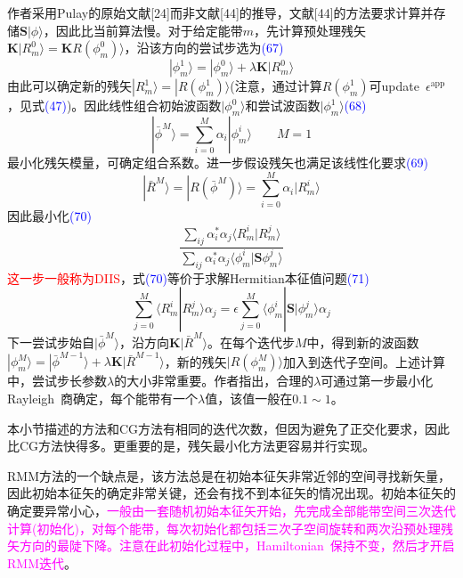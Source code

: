 \documentclass[14pt]{article}      %
\begin{document}
作者采用\textrm{Pulay}的原始文献[24]而非文献[44]的推导，文献[44]的方法要求计算并存储$\mathbf{S}|\phi\rangle$，因此比当前算法慢。对于给定能带$m$，先计算预处理残矢$\mathbf{K}|R_m^0\rangle=\mathbf{K}R(\phi_m^0)\rangle$，沿该方向的尝试步选为\textcolor{blue}{(67)}
\begin{displaymath}
	|\phi_m^1\rangle=|\phi_m^0\rangle+\lambda\mathbf{K}|R_m^0\rangle
\end{displaymath}
由此可以确定新的残矢$|R_m^1\rangle=|R(\phi_m^1)\rangle$(注意，通过计算$R(\phi_m^1)$可\textrm{update}~$\epsilon^{\mathrm{app}}$，见式\textcolor{blue}{(47)})。因此线性组合初始波函数$|\phi_m^0\rangle$和尝试波函数$|\phi_m^1\rangle$\textcolor{blue}{(68)}
\begin{displaymath}
	|\bar{\phi}^M\rangle=\sum_{i=0}^M\alpha_i|\phi_m^i\rangle\qquad M=1
\end{displaymath}
最小化残矢模量，可确定组合系数。进一步假设残矢也满足该线性化要求\textcolor{blue}{(69)}
\begin{displaymath}
	|\bar{R}^M\rangle=|R(\bar{\phi}^M)\rangle=\sum_{i=0}^M\alpha_i|R_m^i\rangle
\end{displaymath}
因此最小化\textcolor{blue}{(70)}
\begin{displaymath}
	\dfrac{\sum_{ij}\alpha_i^{\ast}\alpha_j\langle R_m^i|R_m^j\rangle}{\sum_{ij}\alpha_i^{\ast}\alpha_j\langle\phi_m^i|\mathbf{S}\phi_m^j\rangle}
\end{displaymath}
\textcolor{red}{这一步一般称为\textrm{DIIS}}，式\textcolor{blue}{(70)}等价于求解\textrm{Hermitian}本征值问题\textcolor{blue}{(71)}
\begin{displaymath}
	\sum_{j=0}^M\langle R_m^i|R_m^j\rangle\alpha_j=\epsilon\sum_{j=0}^M\langle\phi_m^i|\mathbf{S}|\phi_m^j\rangle\alpha_j
\end{displaymath}
下一尝试步始自$|\bar{\phi}^M\rangle$，沿方向$\mathbf{K}|\bar{R}^M\rangle$。在每个迭代步$M$中，得到新的波函数$|\phi_m^M\rangle=|\bar{\phi}^{M-1}\rangle+\lambda\mathbf{K}|\bar{R}^{M-1}\rangle$，新的残矢$|R(\phi_m^M)\rangle$加入到迭代子空间。上述计算中，尝试步长参数$\lambda$的大小非常重要。作者指出，合理的$\lambda$可通过第一步最小化\textrm{Rayleigh~}商确定，每个能带有一个$\lambda$值，该值一般在$0.1\sim1$。

本小节描述的方法和\textrm{CG}方法有相同的迭代次数，但因为避免了正交化要求，因此比\textrm{CG}方法快得多。更重要的是，残矢最小化方法更容易并行实现。

\textrm{RMM}方法的一个缺点是，该方法总是在初始本征矢非常近邻的空间寻找新矢量，因此初始本征矢的确定非常关键，还会有找不到本征矢的情况出现。初始本征矢的确定要异常小心，\textcolor{magenta}{一般由一套随机初始本征矢开始，先完成全部能带空间三次迭代计算(初始化)，对每个能带，每次初始化都包括三次子空间旋转和两次沿预处理残矢方向的最陡下降。注意在此初始化过程中，\textrm{Hamiltonian~}保持不变，然后才开启\textrm{RMM}迭代}。
\end{document}

